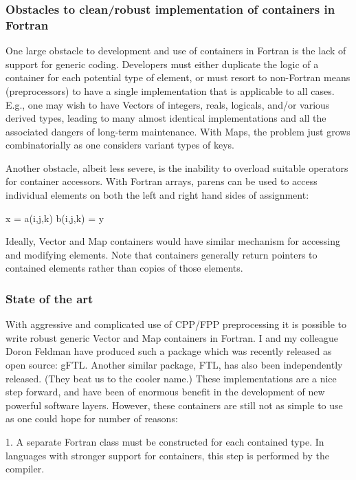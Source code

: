 \documentclass{article}
\begin{document}
\subsubsection{Obstacles to clean/robust implementation of containers in Fortran}

One large obstacle to development and use of containers in Fortran is
the lack of support for generic coding.  Developers must either
duplicate the logic of a container for each potential type of element,
or must resort to non-Fortran means (preprocessors) to have a single
implementation that is applicable to all cases.  E.g., one may wish to
have Vectors of integers, reals, logicals, and/or various derived
types, leading to many almost identical implementations and all the
associated dangers of long-term maintenance.  With Maps, the problem
just grows combinatorially as one considers variant types of keys.

Another obstacle, albeit less severe, is the inability to overload
suitable operators for container accessors.  With Fortran arrays,
parens can be used to access individual elements on both the left and
right hand sides of assignment:

      x = a(i,j,k)
      b(i,j,k) = y


Ideally, Vector and Map containers would have similar mechanism for
accessing and modifying elements.  Note that containers generally
return pointers to contained elements rather than copies of those
elements.


\subsubsection{State of the art}

With aggressive and complicated use of CPP/FPP preprocessing it is
possible to write robust generic Vector and Map containers in Fortran.
I and my colleague Doron Feldman have produced such a package which
was recently released as open source: gFTL.  Another similar package,
FTL, has also been independently released.  (They beat us to the
cooler name.)  These implementations are a nice step forward, and have
been of enormous benefit in the development of new powerful software
layers.  However, these containers are still not as simple to use as
one could hope for number of reasons:

1. A separate Fortran class must be constructed for each contained
   type.  In languages with stronger support for containers, this step
   is performed by the compiler.
\end{document}
